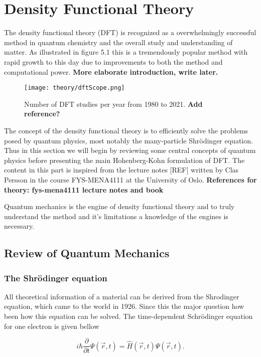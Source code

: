 \chapter{Density Functional Theory}
\label{sec:DFT}

The density functional theory (DFT) is recognized as a overwhelmingly successful method in quantum chemistry and the overall study and understanding of matter. As illustrated in figure 5.1 this is a tremendously popular method with rapid growth to this day due to improvements to both the method and computational power. \textbf{More elaborate introduction, write later.}
\begin{figure}[H]
\texttt{[image: theory/dftScope.png]}
\caption{Number of DFT studies per year from 1980 to 2021. \textbf{Add reference?}}
\end{figure}

The concept of the density functional theory is to efficiently solve the problems posed by quantum physics, most notably the many-particle Shr\"{o}dinger equation. Thus in this section we will begin by reviewing some central concepts of quantum physics before presenting the main Hohenberg-Kohn formulation of DFT. The content in this part is inspired from the lecture notes [REF] written by Clas Persson in the course FYS-MENA4111 at the University of Oslo.
\textbf{References for theory: fys-mena4111 lecture notes and book}

Quantum mechanics is the engine of density functional theory and to truly understand the method and it's limitations a knowledge of the engines is necessary. 
\section{Review of Quantum Mechanics}

\subsection{The Shr\"{o}dinger equation}
All theoretical information of a material can be derived from the Shrodinger equation, which came to the world in 1926. Since this the major question how been how this equation can be solved. 
The time-dependent Schr\"{o}dinger equation for one electron is given bellow

\begin{equation}
    i\hbar\frac{\partial}{\partial t}\Psi(\vec{r}, t) = \hat{H}(\vec{r},t)\Psi(\vec{r}, t).
\end{equation}

